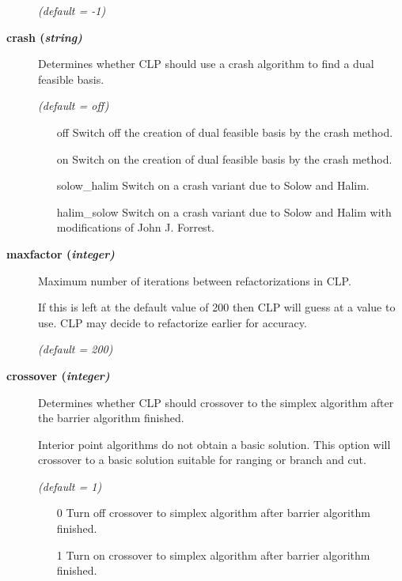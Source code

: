 \begin{description}
\textsl{(default = -1)}

\item[\label{crash}\hypertarget{crash}
{\textbf{crash (\slshape{string})}}]\hspace{1.0in}

Determines whether CLP should use a crash algorithm to find a dual feasible basis.

\textsl{(default = off)}
\begin{itemize}
\item[off] 
Switch off the creation of dual feasible basis by the crash method.
\item[on] 
Switch on the creation of dual feasible basis by the crash method.
\item[solow\_halim] 
Switch on a crash variant due to Solow and Halim.
\item[halim\_solow] 
Switch on a crash variant due to Solow and Halim with modifications of John J. Forrest.
\end{itemize}

\item[\label{maxfactor}\hypertarget{maxfactor}
{\textbf{maxfactor (\slshape{integer})}}]\hspace{1.0in}

Maximum number of iterations between refactorizations in CLP.

If this is left at the default value of 200 then CLP will guess at a value to use.
CLP may decide to refactorize earlier for accuracy.

\textsl{(default = 200)}

\item[\label{crossover}\hypertarget{crossover}
{\textbf{crossover (\slshape{integer})}}]\hspace{1.0in}

Determines whether CLP should crossover to the simplex algorithm after the barrier algorithm finished.

Interior point algorithms do not obtain a basic solution.
This option will crossover to a basic solution suitable for ranging or branch and cut.

\textsl{(default = 1)}
\begin{itemize}
\item[0] 
Turn off crossover to simplex algorithm after barrier algorithm finished.
\item[1] 
Turn on crossover to simplex algorithm after barrier algorithm finished.
\end{itemize}


\end{description}
